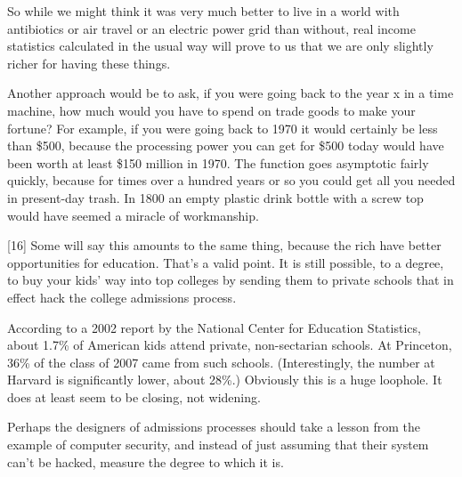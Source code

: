 So while we might think it
                  was very much better to live in a world with antibiotics or
                  air travel or an electric power grid than without, real income
                  statistics calculated in the usual way will prove to us that
                  we are only slightly richer for having these things.

Another
                  approach would be to ask, if you were going back to the year x
                  in a time machine, how much would you have to spend on trade
                  goods to make your fortune? For example, if you were going
                  back to 1970 it would certainly be less than \$500, because the
                  processing power you can get for \$500 today would have been
                  worth at least \$150 million in 1970. The function goes
                  asymptotic fairly quickly, because for times over a hundred
                  years or so you could get all you needed in present-day trash.
                  In 1800 an empty plastic drink bottle with a screw top would
                  have seemed a miracle of workmanship.

[16] Some will say this amounts to the same thing, because the
                  rich have better opportunities for education. That's a valid
                  point. It is still possible, to a degree, to buy your kids'
                  way into top colleges by sending them to private schools that
                  in effect hack the college admissions process.

According
                  to a 2002 report by the National Center for Education
                  Statistics, about 1.7\% of American kids attend private,
                  non-sectarian schools. At Princeton, 36\% of the class of 2007
                  came from such schools. (Interestingly, the number at Harvard
                  is significantly lower, about 28\%.) Obviously this is a huge
                  loophole. It does at least seem to be closing, not
                  widening.

Perhaps the designers of admissions
                  processes should take a lesson from the example of computer
                  security, and instead of just assuming that their system can't
                  be hacked, measure the degree to which it is.


              
            
          

